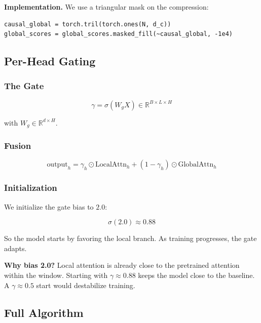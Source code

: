 \textbf{Implementation.} We use a triangular mask on the compression:

\begin{lstlisting}
causal_global = torch.tril(torch.ones(N, d_c))
global_scores = global_scores.masked_fill(~causal_global, -1e4)
\end{lstlisting}

\subsection{Per-Head Gating}

\subsubsection{The Gate}

\begin{equation}
\gamma = \sigma(W_g X) \in \mathbb{R}^{B \times L \times H}
\end{equation}

with $W_g \in \mathbb{R}^{d \times H}$.

\subsubsection{Fusion}

\begin{equation}
\text{output}_h = \gamma_h \odot \text{LocalAttn}_h + (1 - \gamma_h) \odot \text{GlobalAttn}_h
\end{equation}

\subsubsection{Initialization}

We initialize the gate bias to $2.0$:

\begin{equation}
\sigma(2.0) \approx 0.88
\end{equation}

So the model starts by favoring the local branch. As training progresses, 
the gate adapts.

\textbf{Why bias 2.0?} Local attention is already close to the pretrained 
attention within the window. Starting with $\gamma \approx 0.88$ keeps 
the model close to the baseline. A $\gamma \approx 0.5$ start would 
destabilize training.

\subsection{Full Algorithm}

